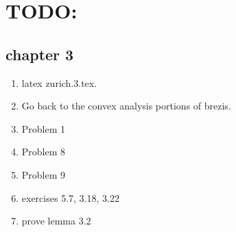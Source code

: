 \documentclass{pset}
\begin{document}
\section{TODO:}
\subsection{chapter 3}
\begin{enumerate}
    \item latex zurich.3.tex.
    \item Go back to the convex analysis portions of brezis.
    \item Problem 1
    \item Problem 8
    \item Problem 9
    \item exercises 5.7, 3.18, 3.22
    \item prove lemma 3.2
\end{enumerate}
\end{document}
